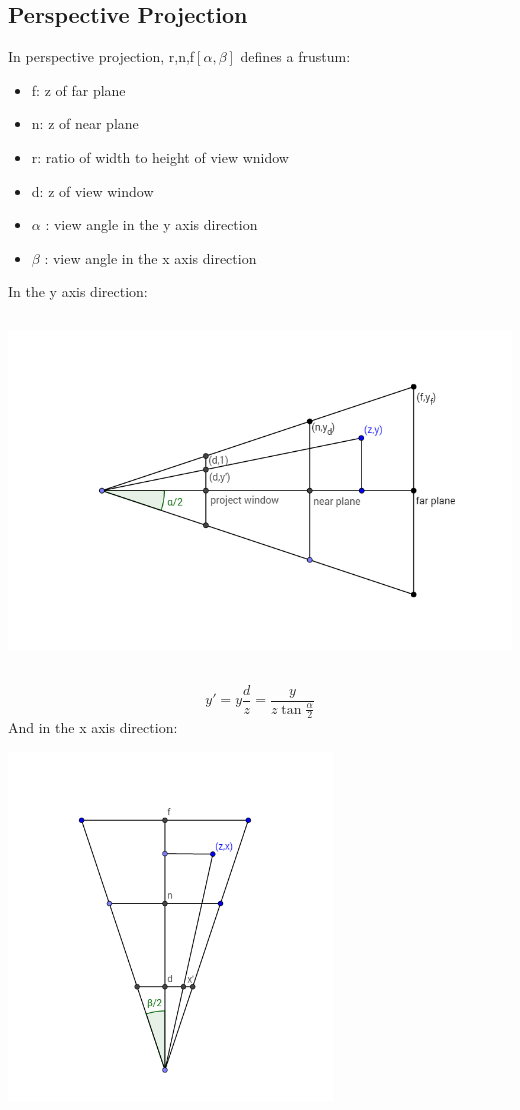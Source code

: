\documentclass[12pt]{article}
\begin{document}
    \subsection{Perspective Projection}
    In perspective projection, r,n,f\(\left[\alpha,\beta\right]\) defines a frustum:
    \begin{itemize}
        \item f: z of far plane
        \item n: z of near plane
        \item r: ratio of width to height of view wnidow
        \item d: z of view window
        \item \(\alpha\) : view angle in the y axis direction
        \item \(\beta\) : view angle in the x axis direction
    \end{itemize}
    In the y axis direction:
    \begin{center}
        \includegraphics[height=25em]{geogebra/project_y.png}
    \end{center}
    \[
        y'=y\frac{d}{z}=\frac{y}{z\tan{\frac{\alpha}{2}}}
    \]
    And in the x axis direction:
    \begin{center}
        \includegraphics[height=25em]{geogebra/project_x.png}
    \end{center}
\end{document}

